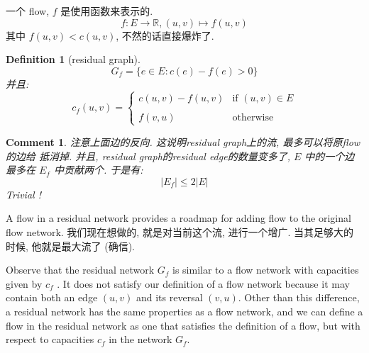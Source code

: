\documentclass[a4paper, 10pt]{ctexart} %
\newtheorem{definition}{Definition}
\newtheorem{corollary}{Comment}
\begin{document}
一个 flow, $f$ 是使用函数来表示的.
$$ f : E \to \mathbb R , (u,v ) \mapsto f (u,v) $$
其中 $ f(u ,v ) < c (u, v) $, 不然的话直接爆炸了.

\begin{definition}[residual graph]
$$ G_f = \{ e\in E : c(e) - f(e) > 0 \} $$
并且: 
$$ c_f \left(u ,v \right) = \begin{cases} c (u,v)  -f (u,v) & \text{if } \left(u ,v\right) \in E \\ \\ f \left( v, u\right) & \text{otherwise} \end{cases} $$
\end{definition}
\begin{corollary}
注意上面边的反向. 这说明residual 
graph上的流, 最多可以将原flow的边给
抵消掉. 
并且, residual graph的residual 
edge的数量变多了, $ E $ 中的一个边最多在 $ E_f $ 
中贡献两个. 于是有: 
$$ 
| E_f | \le 2 | E| 
$$
Trivial ! 
\end{corollary}

A flow in a residual network provides 
a roadmap for adding flow to the original
flow network. 我们现在想做的, 就是对当前这个流, 
进行一个增广. 当其足够大的
时候, 他就是最大流了 (确信). 

Observe that the residual network 
$ G_f $ is similar to a flow network 
with capacities
given by $ c_f $ . It does not satisfy 
our definition of a flow network because it may
contain both an edge $ (u,v) $ and 
its reversal $ (v,u) $. Other than 
this difference, a
residual network has the same properties 
as a flow network, and we can define a
flow in the residual network as one 
that satisfies the definition of a flow, but with
respect to capacities $ c_f $ 
in the network $ G_f $.
\end{document}
